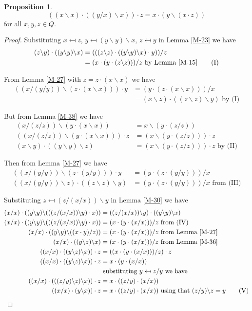 \documentclass[12pt, twoside, openright]{report}
\theoremstyle{definition}
\newtheorem{prp}[thm]{Proposition}
\newcommand{\ldv}{\backslash}       %
\begin{document}
\begin{prp}\label{BI}
  \[((x\ldv x)\cdot ((y/x)\ldv x))\cdot z = x\cdot (y\ldv(x\cdot z))\]
  for all $x, y, z\in Q$.
\end{prp}

\begin{proof}
  Substituting $x \mapsfrom z$, $y \mapsfrom (y\ldv y)\ldv x$, $z \mapsfrom y$ in Lemma \ref{M-23} we have
  \begin{align*}
    (z\ldv y)\cdot ((y\ldv y)\ldv x) &= (((z\ldv z)\cdot((y\ldv y)\ldv x)\cdot y))/z \\
    &= (x\cdot(y\cdot(z\ldv z)))/z\text{ by Lemma \ref{M-15}}\tag{I}
  \end{align*}

  From Lemma \ref{M-27} with $z = z\cdot(x\ldv x)$ we have
  \begin{align*}
    ((x/(y/y))\ldv(z\cdot(x\ldv x)))\cdot y &= (y\cdot(z\cdot(x\ldv x)))/x\\
    &= (x\ldv z)\cdot ((z\ldv z)\ldv y)\text{ by (I)} \tag{II}
  \end{align*}

  But from Lemma \ref{M-38} we have
  \begin{align*}
    (x/(z/z))\ldv(y\cdot(x\ldv x)) &= x\ldv(y\cdot (z/z))\\
    ((x/(z/z))\ldv(y\cdot(x\ldv x)))\cdot z &= (x\ldv(y\cdot (z/z)))\cdot z\\
    (x\ldv y)\cdot((y\ldv y)\ldv z) &= (x\ldv(y\cdot(z/z)))\cdot z\text{ by (II)} \tag{III}
  \end{align*}

  Then from Lemma \ref{M-27} we have
  \begin{align*}
    ((x/(y/y))\ldv (z\cdot(y/y))) \cdot y &= (y\cdot (z\cdot(y/y)))/x\\
    ((x/(y/y))\ldv z)\cdot ((z\ldv z)\ldv y) &= (y\cdot (z\cdot (y/y)))/x\text{ from (III)}\tag{IV}
  \end{align*}

  Substituting $z \mapsfrom (z/(x/x))\ldv y$ in Lemma \ref{M-30} we have
  \begin{align*}
    (x/x)\cdot((y\ldv y)\ldv(((z/(x/x))\ldv y)\cdot x)) &= ((z/(x/x))\ldv y)\cdot ((y\ldv y)\ldv x)\\
    (x/x)\cdot((y\ldv y)\ldv(((z/(x/x))\ldv y)\cdot x)) &= (x\cdot (y\cdot (x/x)))/z\text{ from (IV)}\\
    (x/x)\cdot((y\ldv y)\ldv((x\cdot y)/z)) &= (x\cdot(y\cdot (x/x)))/z\text{ from Lemma \ref{M-27}}\\
    (x/x)\cdot((y\ldv z)\ldv x) &= (x\cdot(y\cdot (x/x)))/z\text{ from Lemma \ref{M-36}}\\
    ((x/x)\cdot((y\ldv z)\ldv x))\cdot z &= ((x\cdot(y\cdot (x/x)))/z)\cdot z\\
    ((x/x)\cdot((y\ldv z)\ldv x))\cdot z &= x\cdot(y\cdot (x/x))\\
    &\text{ substituting $y \mapsfrom z/y$ we have}\\
    ((x/x)\cdot (((z/y)\ldv z)\ldv x))\cdot z &= x\cdot ((z/y)\cdot (x/x))\\
    ((x/x)\cdot (y\ldv x))\cdot z &= x\cdot ((z/y)\cdot (x/x))\text{ using that $(z/y)\ldv z = y$} \tag{V}
  \end{align*}


\end{proof}
\end{document}
